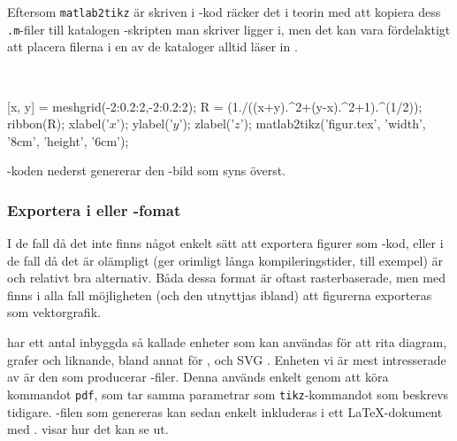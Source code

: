 \documentclass[lang=sv,ptsize=10pt,font=none,nomath,titles=bf,../../a4.tex]{subfiles}
\begin{document}
Eftersom \texttt{matlab2tikz} är skriven i \MATLAB-kod räcker det i
teorin med att kopiera dess \texttt{.m}-filer till katalogen
\MATLAB-skripten man skriver ligger i, men det kan vara fördelaktigt att
placera filerna i en av de kataloger \MATLAB alltid läser in
\parencite{MATLAB13:path}.

\begin{kod}[tbp]
	\centering
	\begin{minipage}{\textwidth}
		\centering
		
	\end{minipage}
	\\[2ex]
	\begin{minipage}{\textwidth}
		\begin{matlabcode}
[x, y] = meshgrid(-2:0.2:2,-2:0.2:2);
R = (1./((x+y).^2+(y-x).^2+1).^(1/2));
ribbon(R);
xlabel('$x$'); ylabel('$y$'); zlabel('$z$');
matlab2tikz('figur.tex', 'width', '8cm', 'height', '6cm');
		\end{matlabcode}
	\end{minipage}
	\caption{\MATLAB-koden nederst genererar den \PGFTikZ-bild som
	syns överst.}
	\label{ex:matlab2tikz}
\end{kod}

\subsubsection{Exportera i \PDF eller \PNG-fomat}
I de fall då det inte finns något enkelt sätt att exportera figurer som
\PGFTikZ-kod, eller i de fall då det är olämpligt (ger orimligt långa
kompileringstider, till exempel) är \PDF och \PNG relativt bra alternativ.
Båda dessa format är oftast rasterbaserade, men med \PDF finns i alla 
fall möjligheten (och den utnyttjas ibland) att figurerna exporteras
som vektorgrafik.

\Rlogo har ett antal inbyggda så kallade enheter  som kan
användas för att rita diagram, grafer och liknande, bland annat för \EPS,
\PNG och \textsc{SVG} \parencite[\ppno~675–676]{RCoreTeam12}. Enheten vi är mest
intresserade av är den som producerar \PDF-filer. Denna används enkelt
genom att köra kommandot \texttt{pdf}, som tar samma parametrar som
\texttt{tikz}-kommandot som beskrevs tidigare. \PDF-filen som genereras
kan sedan enkelt inkluderas i ett \LaTeX-dokument med .
 visar hur det kan se ut.
\end{document}
